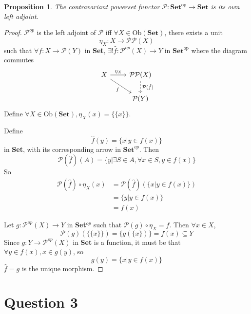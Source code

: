 \documentclass[11pt]{article} %
\newtheorem{proposition}[theorem]{Proposition}
\theoremstyle{definition}
\theoremstyle{definition}
\theoremstyle{definition}
\begin{document}
\begin{proposition}
  The contravariant powerset functor $\mathcal{P}:\textbf{Set}^{\text{op}}\rightarrow\textbf{Set}$
  is its own left adjoint.
\end{proposition}
\begin{proof}
$\mathcal{P}^{op}$ is the left adjoint of $\mathcal{P}$ iff $\forall X\in\text{Ob}(\textbf{Set})$, there exists a unit
\[\eta_X : X \rightarrow \mathcal{P}\mathcal{P}(X)\]
such that $\forall f: X\rightarrow \mathcal{P}(Y)$ in \textbf{Set},
$\exists! \hat{f}: \mathcal{P}^{op}(X) \rightarrow Y$ in $\textbf{Set}^{\text{op}}$
where the diagram commutes
\[\begin{tikzcd}
	X & \mathcal{P}\mathcal{P}(X) \\
	& {\mathcal{P}(Y)}
	\arrow["{\eta_X}", from=1-1, to=1-2]
	\arrow["{\mathcal{P}(\hat{f})}", dashed, from=1-2, to=2-2]
	\arrow["f"', from=1-1, to=2-2]
\end{tikzcd}\]
Define $\forall X\in\text{Ob}(\textbf{Set}),\eta_X(x) = \{\{x\}\}$.

Define 
\[\hat{f}(y) = \{x | y\in f(x)\}\]
in \textbf{Set}, with its corresponding arrow in $\textbf{Set}^{op}$.
Then 
\[\mathcal{P}(\hat{f})(A) = \{y | \exists S \in A, \forall x \in S, y \in f(x)\}\]
So
\begin{equation}
\begin{aligned}
\mathcal{P}(\hat{f})\circ \eta_X (x) &= \mathcal{P}(\hat{f})(\{x | y\in f(x)\})\\
&=\{y | y \in f(x)\}\\
&= f(x)
\end{aligned}
\end{equation}

Let $g: \mathcal{P}^{op}(X) \rightarrow Y$ in \textbf{Set}$^{op}$ such that $\mathcal{P}(g)\circ \eta_X = f$.
Then $\forall x \in X$,
\[\mathcal{P}(g)(\{\{x\}\}) = \{g(\{x\})\} = f(x)\subseteq Y\]
Since $g:Y\rightarrow\mathcal{P}^{op}(X) $ in \textbf{Set} is a function, 
it must be that $\forall y\in f(x), x \in g(y)$, so
\[g(y) = \{x | y \in f(x)\}\]
 $\hat{f} = g$ is the unique morphism.

\end{proof}

\clearpage
\section*{Question 3}
\addtocounter{section}{1}
\end{document}
